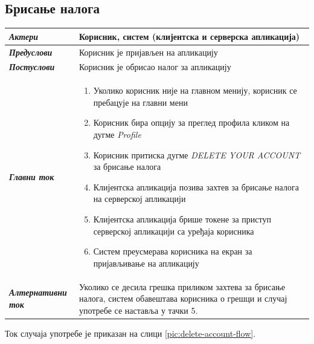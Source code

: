 \documentclass[12pt,oneside]{memoir}
\begin{document}


\subsection*{Брисање налога}
\begin{longtable}{p{0.23\linewidth} p{0.77\linewidth}}
 \hline
 \textit{\textbf{Актери}} & Корисник, систем (клијентска и серверска апликација) \\
\hline

\textit{\textbf{Предуслови}} & Корисник је пријављен на апликацију \\
 \hline
\textit{\textbf{Постуслови}} & Корисник је обрисао налог за апликацију \\
 \hline
 \textit{\textbf{Главни ток}} &  
    \begin{enumerate}
        \item Уколико корисник није на главном менију, корисник се пребацује на главни мени
        \item Корисник бира опцију за преглед профила кликом на дугме \textit{Profile}
        \item Корисник притиска дугме \textit{DELETE YOUR ACCOUNT} за брисање налога
        \item Клијентска апликација позива захтев за брисање налога на серверској апликацији
        \item Клијентска апликација брише токене за приступ серверској апликацији са уређаја корисника
        \item Систем преусмерава корисника на екран за пријављивање на апликацију
    \end{enumerate}\\
 \hline

\textit{\textbf{Алтернативни ток}} & Уколико се десила грешка приликом захтева за брисање налога, систем обавештава корисника о грешци и случај употребе се наставља у тачки 5. \\
 \hline
\end{longtable}

Ток случаја употребе је приказан на слици \ref{pic:delete-account-flow}.
\end{document}
